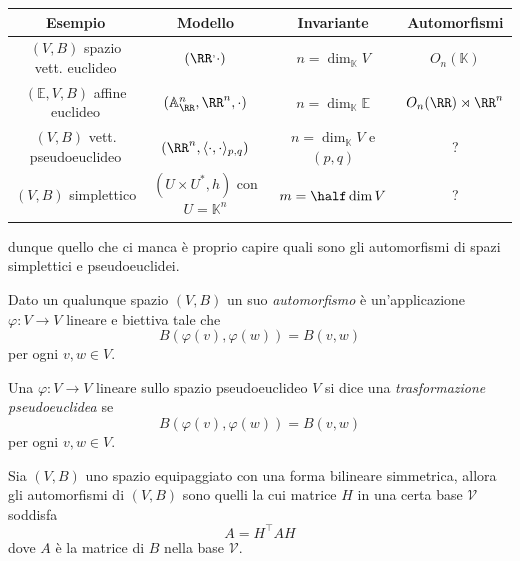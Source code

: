 \documentclass[11pt]{scrartcl}
\renewcommand{\AA}{\mathbb{A}}
\newcommand{\KK}{\mathbb{K}}
\begin{document}
	\begin{center}
		\begin{tabular}{|c|c|c|c|}
			\hline
			Esempio & Modello & Invariante & Automorfismi \\
			\hline
			$(V,B)$ spazio vett. euclideo & $\left(\RR^,\cdot\right)$ & $n=\dim_\KK V$ & $O_n(\KK)$ \\
			\hline
			$(\mathbb{E},V,B)$ affine euclideo & $(\AA^n_\RR,\RR^n,\cdot)$ & $n=\dim_\KK\mathbb{E}$ & $O_n(\RR)\rtimes \RR^n$ \\
			\hline
			$(V,B)$ vett. pseudoeuclideo & $(\RR^n,\langle \cdot,\cdot\rangle_{p,q})$ & $n=\dim_\KK V$ e $(p,q)$ & ? \\
			\hline
			$(V,B)$ simplettico & $(U\times U^*,h)$ con $U=\KK^n$ & $m=\half \dim V$ & ? \\
			\hline
		\end{tabular}
	\end{center}
	dunque quello che ci manca è proprio capire quali sono gli automorfismi di spazi simplettici e pseudoeuclidei. 
	\begin{definition}
		Dato un qualunque spazio $(V,B)$ un suo \textit{automorfismo} è un'applicazione $\varphi:V\to V$ lineare e biettiva tale che
		$$B(\varphi(v),\varphi(w))=B(v,w)$$
		per ogni $v,w\in V$.
	\end{definition}
	\begin{definition}
		Una $\varphi:V\to V$ lineare sullo spazio pseudoeuclideo $V$ si dice una \textit{trasformazione pseudoeuclidea} se 
		$$B(\varphi(v),\varphi(w))=B(v,w)$$
		per ogni $v,w\in V$. 
	\end{definition}
	\begin{remark}
		Sia $(V,B)$ uno spazio equipaggiato con una forma bilineare simmetrica, allora gli automorfismi di $(V,B)$ sono quelli la cui matrice $H$ in una certa base $\mathcal{V}$ soddisfa
		$$A=H^\intercal A H$$
		dove $A$ è la matrice di $B$ nella base $\mathcal{V}$.
	\end{remark}
	
\end{document}
